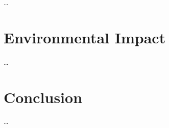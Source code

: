 \documentclass{article}
\begin{document}
{        %
        
    …
}

{
    \section{Environmental Impact}
    \label{sec:env-impact}

    …
}

{
    \section{Conclusion}
    \label{sec:conclusion}

    …
}

{
    
}
\end{document}
